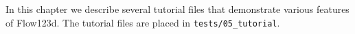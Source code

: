 \providecommand{\tightlist}{%
  \setlength{\itemsep}{0pt}\setlength{\parskip}{0pt}}
  


In this chapter we describe several tutorial files that demonstrate various features of Flow123d.
The tutorial files are placed in \texttt{tests/05\_tutorial}.










